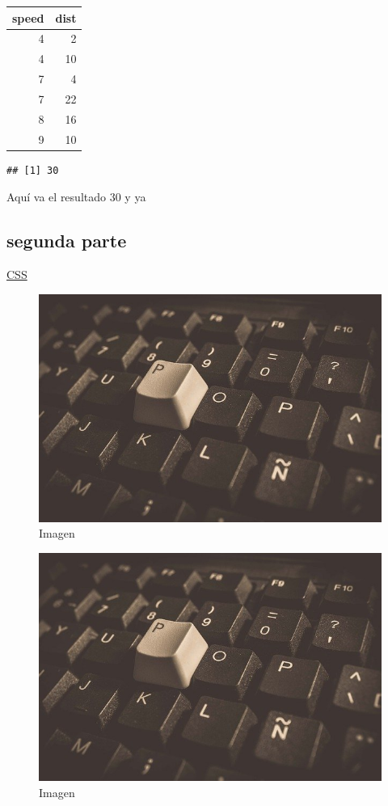 \documentclass[]{article}
\begin{document}
\begin{longtable}[]{@{}rr@{}}
\toprule
speed & dist\tabularnewline
\midrule
\endhead
4 & 2\tabularnewline
4 & 10\tabularnewline
7 & 4\tabularnewline
7 & 22\tabularnewline
8 & 16\tabularnewline
9 & 10\tabularnewline
\bottomrule
\end{longtable}

\begin{verbatim}
## [1] 30
\end{verbatim}

Aquí va el resultado 30 y ya

\hypertarget{segunda-parte}{%
\subsection{segunda parte}\label{segunda-parte}}

\href{https://es.wikipedia.org/wiki/Hoja_de_estilos_en_cascada}{CSS}

\begin{figure}
\centering
\includegraphics{keyboard-2223210_640.jpg}
\caption{Imagen}
\end{figure}

\begin{figure}
\centering
\includegraphics{Images/keyboard-2223210_640.jpg}
\caption{Imagen}
\end{figure}
\end{document}
